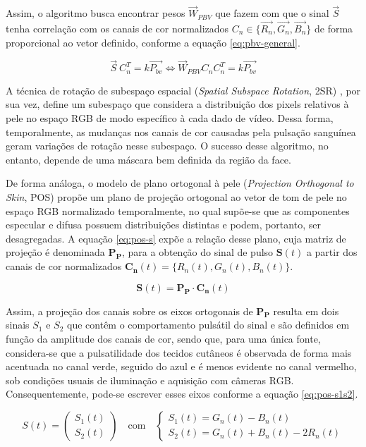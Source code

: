 Assim, o algoritmo busca encontrar pesos \( \vec{W}_{PBV}\) que fazem com que o sinal \(\vec{S}\) tenha correlação com os canais de cor normalizados \(C_n \in  \{\vec{R_n}, \vec{G_n},  \vec{B_n} \} \) de forma proporcional ao vetor definido, conforme a equação \ref{eq:pbv-general}. 

\begin{equation}
    \label{eq:pbv-general}
    \vec{S} \: C_n^T = k \vec{P_{bv}} \Leftrightarrow \vec{W}_{PBV} C_n C_n^T = k \vec{P_{bv}}
\end{equation}

A técnica de rotação de subespaço espacial (\textit{Spatial Subspace Rotation}, 2SR) \cite{wang2015novel}, por sua vez, define um subespaço que considera a distribuição dos pixels relativos à pele no espaço RGB de modo específico à cada dado de vídeo. Dessa forma, temporalmente, as mudanças nos canais de cor causadas pela pulsação sanguínea geram variações de rotação nesse subespaço. O sucesso desse algoritmo, no entanto, depende de uma máscara bem definida da região da face.  

De forma análoga, o modelo de plano ortogonal à pele (\textit{Projection Orthogonal to Skin}, POS) \cite{wang2016algorithmic} propõe um plano de projeção ortogonal ao vetor de tom de pele no espaço RGB normalizado temporalmente, no qual supõe-se que as componentes especular e difusa possuem distribuições distintas e podem, portanto, ser desagregadas. A equação \ref{eq:pos-s} expõe a relação desse plano, cuja matriz de projeção é denominada \(\bm{P_P}\), para a obtenção do sinal de pulso \(\bm{S}(t)\) a partir dos canais de cor normalizados \( \bm{C_n}(t) = \{R_n(t), G_n(t), B_n(t)\} \).

\begin{equation}
\label{eq:pos-s}
    \bm{S}(t) = \bm{P_P} \cdot \bm{C_n}(t)
\end{equation}

Assim, a projeção dos canais sobre os eixos ortogonais de \(\bm{P_P}\) resulta em dois sinais \(S_1\) e \(S_2\) que contêm o comportamento pulsátil do sinal e são definidos em função da amplitude dos canais de cor, sendo que, para uma única fonte, considera-se que a pulsatilidade dos tecidos cutâneos é observada de forma mais acentuada no canal verde, seguido do azul e é menos evidente no canal vermelho, sob condições usuais de iluminação e aquisição com câmeras RGB. Consequentemente, pode-se escrever esses eixos conforme a equação \ref{eq:pos-s1s2}.

\begin{equation}
\label{eq:pos-s1s2}
S(t) =
\begin{pmatrix}
S_1(t) \\
S_2(t)
\end{pmatrix}
\quad \text{com} \quad
\begin{cases}
S_1(t) = G_n(t) - B_n(t) \\
S_2(t) = G_n(t) + B_n(t) - 2R_n(t)
\end{cases}
\end{equation}

